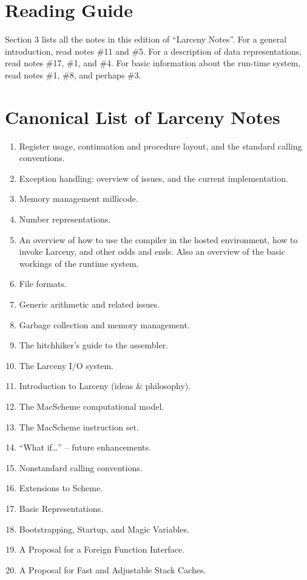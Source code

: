 \section{Reading Guide}

Section 3 lists all the notes in this edition of ``Larceny Notes''. For a
general introduction, read notes \#11 and \#5. For a description of
data representations, read notes \#17, \#1, and \#4. For basic information
about the run-time system, read notes \#1, \#8, and perhaps \#3.

\section{Canonical List of Larceny Notes}

\begin{enumerate}
\item Register usage, continuation and procedure layout, and 
the standard calling conventions.
\item Exception handling: overview of issues, and the current implementation.
\item Memory management millicode.
\item Number representations.
\item An overview of how to use the compiler in the hosted
environment, how to invoke Larceny, and other odds and ends. Also an
overview of the basic workings of the runtime system.
\item File formats.
\item Generic arithmetic and related issues.
\item Garbage collection and memory management.
\item The hitchhiker's guide to the assembler.
\item The Larceny I/O system.
\item Introduction to Larceny (ideas \& philosophy).
\item The MacScheme computational model.
\item The MacScheme instruction set.
\item ``What if\ldots''  --  future enhancements.
\item Nonstandard calling conventions.
\item Extensions to Scheme.
\item Basic Representations.
\item Bootstrapping, Startup, and Magic Variables.
\item A Proposal for a Foreign Function Interface.
\item A Proposal for Fast and Adjustable Stack Caches.

\end{enumerate}


